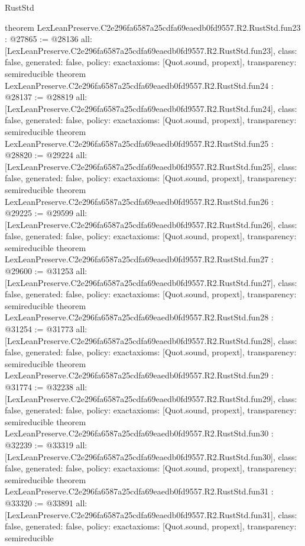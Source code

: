 \begin{lexlean}{RustStd}
\begin{coremodule}
{}
theorem LexLeanPreserve.C2e296fa6587a25cdfa69eaedb0fd9557.R2.RustStd.fun23 : @27865 := @28136 {
  all: [LexLeanPreserve.C2e296fa6587a25cdfa69eaedb0fd9557.R2.RustStd.fun23],
  class: false,
  generated: false,
  policy: exact{axioms: [Quot.sound, propext]},
  transparency: semireducible
}
theorem LexLeanPreserve.C2e296fa6587a25cdfa69eaedb0fd9557.R2.RustStd.fun24 : @28137 := @28819 {
  all: [LexLeanPreserve.C2e296fa6587a25cdfa69eaedb0fd9557.R2.RustStd.fun24],
  class: false,
  generated: false,
  policy: exact{axioms: [Quot.sound, propext]},
  transparency: semireducible
}
theorem LexLeanPreserve.C2e296fa6587a25cdfa69eaedb0fd9557.R2.RustStd.fun25 : @28820 := @29224 {
  all: [LexLeanPreserve.C2e296fa6587a25cdfa69eaedb0fd9557.R2.RustStd.fun25],
  class: false,
  generated: false,
  policy: exact{axioms: [Quot.sound, propext]},
  transparency: semireducible
}
theorem LexLeanPreserve.C2e296fa6587a25cdfa69eaedb0fd9557.R2.RustStd.fun26 : @29225 := @29599 {
  all: [LexLeanPreserve.C2e296fa6587a25cdfa69eaedb0fd9557.R2.RustStd.fun26],
  class: false,
  generated: false,
  policy: exact{axioms: [Quot.sound, propext]},
  transparency: semireducible
}
theorem LexLeanPreserve.C2e296fa6587a25cdfa69eaedb0fd9557.R2.RustStd.fun27 : @29600 := @31253 {
  all: [LexLeanPreserve.C2e296fa6587a25cdfa69eaedb0fd9557.R2.RustStd.fun27],
  class: false,
  generated: false,
  policy: exact{axioms: [Quot.sound, propext]},
  transparency: semireducible
}
theorem LexLeanPreserve.C2e296fa6587a25cdfa69eaedb0fd9557.R2.RustStd.fun28 : @31254 := @31773 {
  all: [LexLeanPreserve.C2e296fa6587a25cdfa69eaedb0fd9557.R2.RustStd.fun28],
  class: false,
  generated: false,
  policy: exact{axioms: [Quot.sound, propext]},
  transparency: semireducible
}
theorem LexLeanPreserve.C2e296fa6587a25cdfa69eaedb0fd9557.R2.RustStd.fun29 : @31774 := @32238 {
  all: [LexLeanPreserve.C2e296fa6587a25cdfa69eaedb0fd9557.R2.RustStd.fun29],
  class: false,
  generated: false,
  policy: exact{axioms: [Quot.sound, propext]},
  transparency: semireducible
}
theorem LexLeanPreserve.C2e296fa6587a25cdfa69eaedb0fd9557.R2.RustStd.fun30 : @32239 := @33319 {
  all: [LexLeanPreserve.C2e296fa6587a25cdfa69eaedb0fd9557.R2.RustStd.fun30],
  class: false,
  generated: false,
  policy: exact{axioms: [Quot.sound, propext]},
  transparency: semireducible
}
theorem LexLeanPreserve.C2e296fa6587a25cdfa69eaedb0fd9557.R2.RustStd.fun31 : @33320 := @33891 {
  all: [LexLeanPreserve.C2e296fa6587a25cdfa69eaedb0fd9557.R2.RustStd.fun31],
  class: false,
  generated: false,
  policy: exact{axioms: [Quot.sound, propext]},
  transparency: semireducible
}
\end{coremodule}
\end{lexlean}
